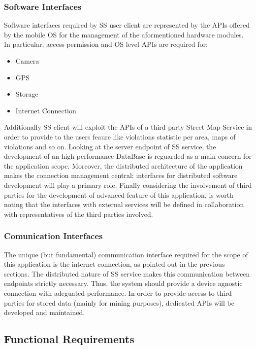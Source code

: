 	\subsubsection{Software Interfaces}
	Software interfaces required by SS user client are represented by the APIs offered by the mobile OS for the management of the aformentioned hardware modules. In particular, access permission and OS level APIs are required for:
	\begin{itemize} 
		\item Camera
		\item GPS
		\item Storage
		\item Internet Connection
	\end{itemize}
	Additionally SS client will exploit the APIs of a third party Street Map Service in order to provide to the users feaure like violations statistic per area, maps of violations and so on.\newline
		Looking at the server endpoint of SS service, the development of an high performance DataBase is reguarded as a main concern for the application scope. Moreover, the distributed architecture of the application makes the connection management central: interfaces for distributed software development will play a primary role. \newline
	Finally considering the involvement of third parties for the development of advanced feature of this application, is worth noting that the interfaces with external services will be defined in collaboration with representatives of the third parties involved.
	 
	\subsubsection{Comunication Interfaces}
	 The unique (but fundamental) communication interface required for the scope of this application is the internet connection, as pointed out in the previous sections. The distributed nature of SS service makes this communication between endpoints strictly necessary. Thus, the system should provide a device agnostic  connection with adeguated performance.\newline
	In order to provide access to  third parties for stored data (mainly for mining purposes), dedicated APIs will be developed and maintained.
	
	\clearpage
	
\subsection{Functional Requirements}
\bigskip

